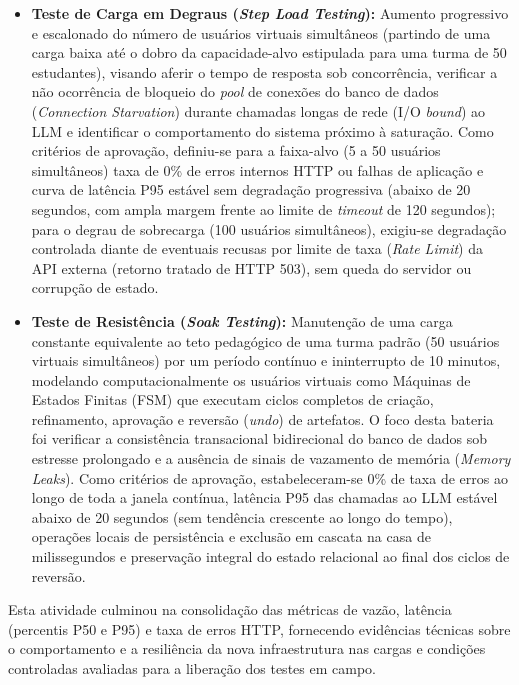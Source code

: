 \begin{itemize}
    \item \textbf{Teste de Carga em Degraus (\textit{Step Load Testing}):} Aumento progressivo e escalonado do número de usuários virtuais simultâneos (partindo de uma carga baixa até o dobro da capacidade-alvo estipulada para uma turma de 50 estudantes), visando aferir o tempo de resposta sob concorrência, verificar a não ocorrência de bloqueio do \textit{pool} de conexões do banco de dados (\textit{Connection Starvation}) durante chamadas longas de rede (I/O \textit{bound}) ao LLM e identificar o comportamento do sistema próximo à saturação. Como critérios de aprovação, definiu-se para a faixa-alvo (5 a 50 usuários simultâneos) taxa de 0\% de erros internos HTTP ou falhas de aplicação e curva de latência P95 estável sem degradação progressiva (abaixo de 20 segundos, com ampla margem frente ao limite de \textit{timeout} de 120 segundos); para o degrau de sobrecarga (100 usuários simultâneos), exigiu-se degradação controlada diante de eventuais recusas por limite de taxa (\textit{Rate Limit}) da API externa (retorno tratado de HTTP 503), sem queda do servidor ou corrupção de estado.
    \item \textbf{Teste de Resistência (\textit{Soak Testing}):} Manutenção de uma carga constante equivalente ao teto pedagógico de uma turma padrão (50 usuários virtuais simultâneos) por um período contínuo e ininterrupto de 10 minutos, modelando computacionalmente os usuários virtuais como Máquinas de Estados Finitas (FSM) que executam ciclos completos de criação, refinamento, aprovação e reversão (\textit{undo}) de artefatos. O foco desta bateria foi verificar a consistência transacional bidirecional do banco de dados sob estresse prolongado e a ausência de sinais de vazamento de memória (\textit{Memory Leaks}). Como critérios de aprovação, estabeleceram-se 0\% de taxa de erros ao longo de toda a janela contínua, latência P95 das chamadas ao LLM estável abaixo de 20 segundos (sem tendência crescente ao longo do tempo), operações locais de persistência e exclusão em cascata na casa de milissegundos e preservação integral do estado relacional ao final dos ciclos de reversão.
\end{itemize}

Esta atividade culminou na consolidação das métricas de vazão, latência (percentis P50 e P95) e taxa de erros HTTP, fornecendo evidências técnicas sobre o comportamento e a resiliência da nova infraestrutura nas cargas e condições controladas avaliadas para a liberação dos testes em campo.

